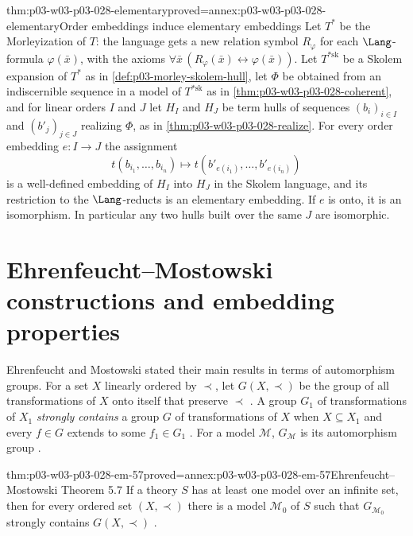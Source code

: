\begin{hblemma}{thm:p03-w03-p03-028-elementary}{proved=annex:p03-w03-p03-028-elementary}{Order embeddings induce elementary embeddings}
Let \(T^*\) be the Morleyization of \(T\): the language gets a new relation
symbol \(R_\varphi\) for each \(\Lang\)-formula \(\varphi(\bar x)\), with
the axioms \(\forall\bar x\,(R_\varphi(\bar x)\leftrightarrow\varphi(\bar
x))\).  Let \(T^{*\mathrm{sk}}\) be a Skolem expansion of \(T^*\) as in
\cref{def:p03-morley-skolem-hull}, let \(\Phi\) be obtained from an
indiscernible sequence in a model of \(T^{*\mathrm{sk}}\) as in
\cref{thm:p03-w03-p03-028-coherent}, and for linear orders \(I\) and \(J\)
let \(H_I\) and \(H_J\) be term hulls of sequences \((b_i)_{i\in I}\) and
\((b'_j)_{j\in J}\) realizing \(\Phi\), as in
\cref{thm:p03-w03-p03-028-realize}.  For every order embedding
\(e\colon I\to J\) the assignment
\[
  t(b_{i_1},\ldots,b_{i_n})\longmapsto t(b'_{e(i_1)},\ldots,b'_{e(i_n)})
\]
is a well-defined embedding of \(H_I\) into \(H_J\) in the Skolem language,
and its restriction to the \(\Lang\)-reducts is an elementary embedding.
If \(e\) is onto, it is an isomorphism.  In particular any two hulls built
over the same \(J\) are isomorphic.
\end{hblemma}

\section{Ehrenfeucht--Mostowski constructions and embedding properties}
\label{sec:p03-w03-p03-028-em}

Ehrenfeucht and Mostowski stated their main results in terms of
automorphism groups.  For a set \(X\) linearly ordered by \(\prec\), let
\(G(X,\prec)\) be the group of all transformations of \(X\) onto itself
that preserve \(\prec\) \cite[p.~63]{EhrenfeuchtMostowski1956}.  A group
\(G_1\) of transformations of \(X_1\) \emph{strongly contains} a group
\(G\) of transformations of \(X\) when \(X\subseteq X_1\) and every
\(f\in G\) extends to some \(f_1\in G_1\)
\cite[p.~59]{EhrenfeuchtMostowski1956}.  For a model \(\mathcal M\),
\(G_{\mathcal M}\) is its automorphism group
\cite[p.~56]{EhrenfeuchtMostowski1956}.

\begin{hbtheorem}{thm:p03-w03-p03-028-em-57}{proved=annex:p03-w03-p03-028-em-57}{Ehrenfeucht--Mostowski Theorem 5.7}
If a theory \(S\) has at least one model over an infinite set, then for
every ordered set \((X,\prec)\) there is a model \(\mathcal M_0\) of \(S\)
such that \(G_{\mathcal M_0}\) strongly contains \(G(X,\prec)\)
\cite[Theorem~5.7, p.~63]{EhrenfeuchtMostowski1956}.
\end{hbtheorem}

